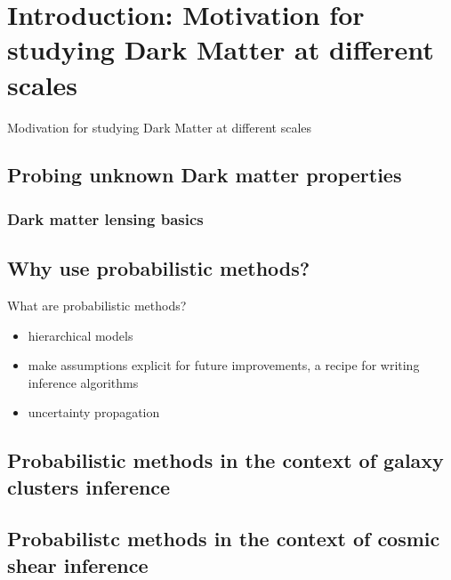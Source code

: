 \documentclass[ucdthesis.tex]{subfiles}
\begin{document}
    
    \doublespacing

		\chapter{Introduction: Motivation for studying Dark Matter at different scales
		}{Modivation for studying Dark Matter at different scales}{}
		\label{chapter:1}

		\section{Probing unknown Dark matter properties}

		\subsection{Dark matter lensing basics}

		\section{Why use probabilistic methods?}
		What are probabilistic methods?
		\begin{itemize}
		\item hierarchical models 
		\item make assumptions explicit for future improvements, a recipe for writing
		inference algorithms 
		\item uncertainty propagation 
		\end{itemize}

		\section{Probabilistic methods in the context of galaxy clusters inference}

		\section{Probabilistc methods in the context of cosmic shear inference}
						 

        
\end{document}
